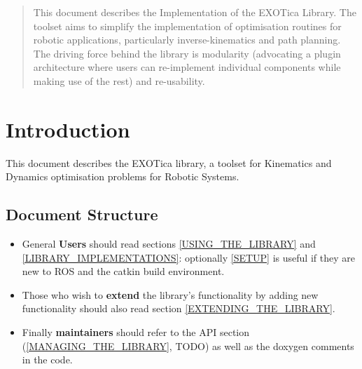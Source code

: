 \documentclass[12pt,a4paper,onecolumn]{article}
\begin{document}
\begin{abstract}
This document describes the Implementation of the EXOTica Library. The toolset aims to simplify the implementation of optimisation routines for robotic applications, particularly inverse-kinematics and path planning. The driving force behind the library is modularity (advocating a plugin architecture where users can re-implement individual components while making use of the rest) and re-usability.
\end{abstract}

\newpage
\tableofcontents

\newpage
\section{Introduction}
\label{INTRODUCTION}
This document describes the EXOTica library, a toolset for Kinematics and Dynamics optimisation problems for Robotic Systems. 

\subsection{Document Structure}
\begin{itemize}
\item General \textbf{Users} should read sections \ref{USING_THE_LIBRARY} and \ref{LIBRARY_IMPLEMENTATIONS}: optionally \ref{SETUP} is useful if they are new to ROS and the catkin build environment.
\item Those who wish to \textbf{extend} the library's functionality by adding new functionality should also read section \ref{EXTENDING_THE_LIBRARY}.
\item Finally \textbf{maintainers} should refer to the API section (\ref{MANAGING_THE_LIBRARY}, TODO) as well as the doxygen comments in the code.
\end{itemize}
\end{document}
